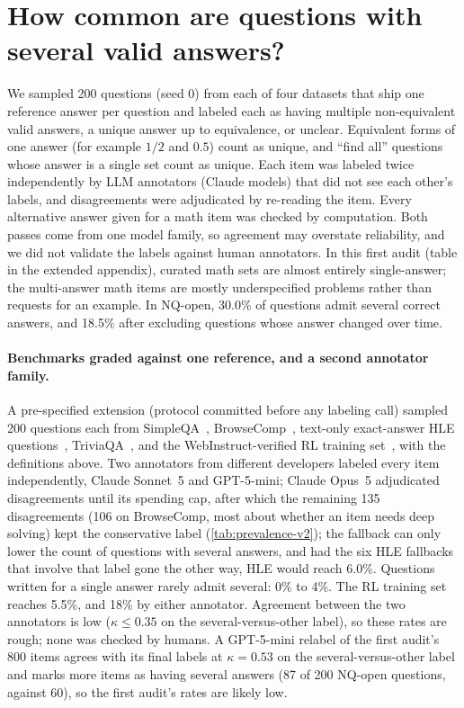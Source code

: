 \FloatBarrier
\section{How common are questions with several valid answers?}
\label{app:prevalence}

We sampled 200 questions (seed 0) from each of four datasets that ship one reference answer per question and labeled each as having multiple non-equivalent valid answers, a unique answer up to equivalence, or unclear. Equivalent forms of one answer (for example $1/2$ and $0.5$) count as unique, and ``find all'' questions whose answer is a single set count as unique. Each item was labeled twice independently by LLM annotators (Claude models) that did not see each other's labels, and disagreements were adjudicated by re-reading the item. Every alternative answer given for a math item was checked by computation. Both passes come from one model family, so agreement may overstate reliability, and we did not validate the labels against human annotators.
In this first audit (table in the extended appendix), curated math sets are almost entirely single-answer; the multi-answer math items are mostly underspecified problems rather than requests for an example. In NQ-open, 30.0\% of questions admit several correct answers, and 18.5\% after excluding questions whose answer changed over time.

\paragraph{Benchmarks graded against one reference, and a second annotator family.} A pre-specified extension (protocol committed before any labeling call) sampled 200 questions each from SimpleQA~\citep{wei2024simpleqa}, BrowseComp~\citep{wei2025browsecomp}, text-only exact-answer HLE questions~\citep{phan2025hle}, TriviaQA~\citep{joshi2017triviaqa}, and the WebInstruct-verified RL training set~\citep{ma2025generalreasoner}, with the definitions above. Two annotators from different developers labeled every item independently, Claude Sonnet~5 and GPT-5-mini; Claude Opus~5 adjudicated disagreements until its spending cap, after which the remaining 135 disagreements (106 on BrowseComp, most about whether an item needs deep solving) kept the conservative label (\cref{tab:prevalence-v2}); the fallback can only lower the count of questions with several answers, and had the six HLE fallbacks that involve that label gone the other way, HLE would reach 6.0\%. Questions written for a single answer rarely admit several: 0\% to 4\%. The RL training set reaches 5.5\%, and 18\% by either annotator. Agreement between the two annotators is low ($\kappa \le 0.35$ on the several-versus-other label), so these rates are rough; none was checked by humans. A GPT-5-mini relabel of the first audit's 800 items agrees with its final labels at $\kappa = 0.53$ on the several-versus-other label and marks more items as having several answers (87 of 200 NQ-open questions, against 60), so the first audit's rates are likely low.


